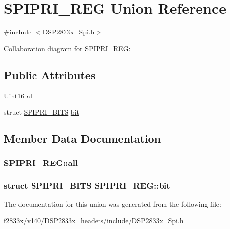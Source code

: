 \hypertarget{union_s_p_i_p_r_i___r_e_g}{}\section{S\+P\+I\+P\+R\+I\+\_\+\+R\+E\+G Union Reference}
\label{union_s_p_i_p_r_i___r_e_g}


{\ttfamily \#include $<$D\+S\+P2833x\+\_\+\+Spi.\+h$>$}



Collaboration diagram for S\+P\+I\+P\+R\+I\+\_\+\+R\+E\+G\+:
\subsection*{Public Attributes}
\begin{DoxyCompactItemize}
\item 
\hyperlink{_d_s_p2833x___device_8h_a59a9f6be4562c327cbfb4f7e8e18f08b}{Uint16} \hyperlink{union_s_p_i_p_r_i___r_e_g_ae63d1f16ba62ba31e1d85f3b886671e0}{all}
\item 
struct \hyperlink{struct_s_p_i_p_r_i___b_i_t_s}{S\+P\+I\+P\+R\+I\+\_\+\+B\+I\+T\+S} \hyperlink{union_s_p_i_p_r_i___r_e_g_a89988a1352d6ef6fe6884512df4bd07a}{bit}
\end{DoxyCompactItemize}


\subsection{Member Data Documentation}
\hypertarget{union_s_p_i_p_r_i___r_e_g_ae63d1f16ba62ba31e1d85f3b886671e0}{}
\subsubsection[{all}]{ S\+P\+I\+P\+R\+I\+\_\+\+R\+E\+G\+::all}\label{union_s_p_i_p_r_i___r_e_g_ae63d1f16ba62ba31e1d85f3b886671e0}
\hypertarget{union_s_p_i_p_r_i___r_e_g_a89988a1352d6ef6fe6884512df4bd07a}{}
\subsubsection[{bit}]{\setlength{\rightskip}{0pt plus 5cm}struct {\bf S\+P\+I\+P\+R\+I\+\_\+\+B\+I\+T\+S} S\+P\+I\+P\+R\+I\+\_\+\+R\+E\+G\+::bit}\label{union_s_p_i_p_r_i___r_e_g_a89988a1352d6ef6fe6884512df4bd07a}


The documentation for this union was generated from the following file\+:\begin{DoxyCompactItemize}
\item 
f2833x/v140/\+D\+S\+P2833x\+\_\+headers/include/\hyperlink{_d_s_p2833x___spi_8h}{D\+S\+P2833x\+\_\+\+Spi.\+h}\end{DoxyCompactItemize}
